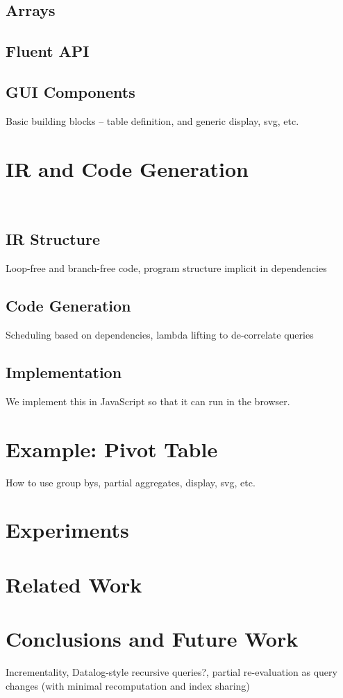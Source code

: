\documentclass[runningheads]{llncs}
\begin{document}
\subsection{Arrays}
\subsection{Fluent API}

\subsection{GUI Components}
Basic building blocks -- table definition, and generic display, svg, etc. 

\section{IR and Code Generation}~\label{sec:ir_codegen}
\subsection{IR Structure}
Loop-free and branch-free code, program structure implicit in dependencies

\subsection{Code Generation}
Scheduling based on dependencies, lambda lifting to de-correlate queries

\subsection{Implementation}
We implement this in JavaScript so that it can run in the browser.


\section{Example: Pivot Table}\label{sec:case_study}
How to use group bys, partial aggregates, display, svg, etc.

\section{Experiments}\label{sec:experiments}


\section{Related Work}\label{sec:related_work}

\section{Conclusions and Future Work}\label{sec:conclusions}
Incrementality, Datalog-style recursive queries?, partial re-evaluation as
query changes (with minimal recomputation and index sharing)
%
%



\end{document}
